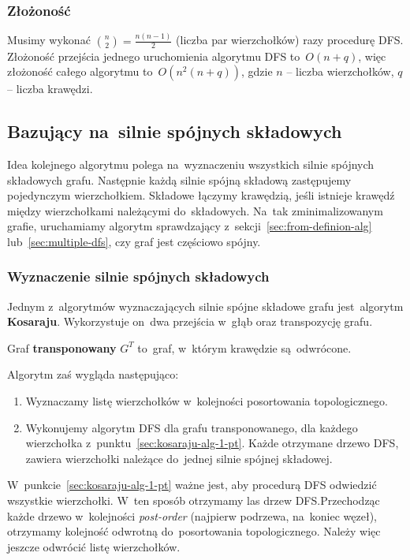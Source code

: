 \documentclass[a4paper,12pt]{mwart}
\begin{document}
\subsubsection{Złożoność}

Musimy wykonać ${n \choose 2} = \frac{n(n - 1)}{2}$ (liczba par wierzchołków)
razy procedurę DFS\@. Złożoność przejścia jednego uruchomienia algorytmu DFS
to~$O(n + q)$, więc złożoność całego algorytmu to~$O(n^2(n + q))$, gdzie $n$ --
liczba wierzchołków, $q$ -- liczba krawędzi.

\subsection{Bazujący na~silnie spójnych składowych}

Idea kolejnego algorytmu polega na~wyznaczeniu wszystkich silnie spójnych
składowych grafu. Następnie każdą silnie spójną składową zastępujemy
pojedynczym wierzchołkiem. Składowe łączymy krawędzią, jeśli istnieje krawędź
między wierzchołkami należącymi do~składowych. Na~tak zminimalizowanym grafie,
uruchamiamy algorytm sprawdzający z~sekcji~\ref{sec:from-definion-alg}
lub~\ref{sec:multiple-dfs}, czy graf jest częściowo spójny.


\subsubsection{Wyznaczenie silnie spójnych składowych}

Jednym z~algorytmów wyznaczających silnie spójne składowe grafu jest~algorytm
\textbf{Kosaraju}. Wykorzystuje on~dwa przejścia w~głąb oraz transpozycję
grafu.

Graf \textbf{transponowany} $G^T$ to~graf, w~którym krawędzie są~odwrócone.

Algorytm zaś wygląda następująco:

\begin{enumerate}
\item\label{sec:kosaraju-alg-1-pt} Wyznaczamy listę wierzchołków w~kolejności
  posortowania topologicznego.
\item\label{sec:kosaraju-alg-2-pt} Wykonujemy algorytm DFS dla grafu
  transponowanego, dla każdego wierzchołka
  z~punktu~\ref{sec:kosaraju-alg-1-pt}. Każde otrzymane drzewo DFS, zawiera
  wierzchołki należące do~jednej silnie spójnej składowej.
\end{enumerate}

W~punkcie~\ref{sec:kosaraju-alg-1-pt} ważne jest, aby procedurą DFS odwiedzić
wszystkie wierzchołki. W~ten sposób otrzymamy las drzew DFS.\@ Przechodząc
każde drzewo w~kolejności \emph{post-order} (najpierw podrzewa, na~koniec
węzeł), otrzymamy kolejność odwrotną do~posortowania topologicznego. Należy
więc jeszcze odwrócić listę wierzchołków.
\end{document}
